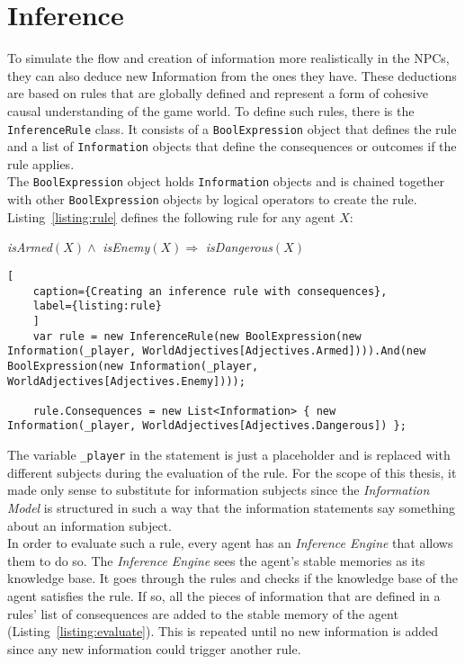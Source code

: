 \section{Inference}
To simulate the flow and creation of information more realistically in the NPCs, they can also deduce new Information from the ones they have. These deductions are based on rules that are globally defined and represent a form of cohesive causal understanding of the game world. To define such rules, there is the \verb|InferenceRule| class. It consists of a \verb|BoolExpression| object that defines the rule and a list of \verb|Information| objects that define the consequences or outcomes if the rule applies.\\
The \verb|BoolExpression| object holds \verb|Information| objects and is chained together with other \verb|BoolExpression| objects by logical operators to create the rule. Listing~\ref{listing:rule} defines the following rule for any agent $X$:
\begin{center}
	\textit{isArmed}$(X) \wedge $ \textit{isEnemy}$(X) \Rightarrow $ \textit{isDangerous}$(X)$ 
\end{center}
\begin{lstlisting}[
	caption={Creating an inference rule with consequences},
	label={listing:rule}
	]
	var rule = new InferenceRule(new BoolExpression(new Information(_player, WorldAdjectives[Adjectives.Armed]))).And(new BoolExpression(new Information(_player, WorldAdjectives[Adjectives.Enemy])));

	rule.Consequences = new List<Information> { new Information(_player, WorldAdjectives[Adjectives.Dangerous]) };
\end{lstlisting}
The variable \verb|_player| in the statement is just a placeholder and is replaced with different subjects during the evaluation of the rule. For the scope of this thesis, it made only sense to substitute for information subjects since the \textit{Information Model} is structured in such a way that the information statements say something about an information subject.\\
In order to evaluate such a rule, every agent has an \textit{Inference Engine} that allows them to do so. The \textit{Inference Engine} sees the agent's stable memories as its knowledge base. It goes through the rules and checks if the knowledge base of the agent satisfies the rule. If so, all the pieces of information that are defined in a rules' list of consequences are added to the stable memory of the agent (Listing~\ref{listing:evaluate}). This is repeated until no new information is added since any new information could trigger another rule.\\

